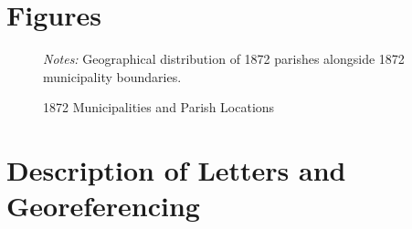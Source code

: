 \documentclass{article}
\begin{document}






\clearpage

\appendix

\setcounter{figure}{0}  
\setcounter{table}{0}  

\renewcommand{\thefigure}{A.\arabic{figure}}
\renewcommand{\thetable}{A.\arabic{table}}

\section{Figures}

\begin{figure}
  \caption{1872 Municipalities and Parish Locations}
  \begin{center}
  \textit{Notes:} Geographical distribution of 1872 parishes alongside 1872 municipality boundaries.
  \end{center}
  \label{fig:parishes_1872}
\end{figure}

\section{Description of Letters and Georeferencing}
\label{app:appendix_data}
\end{document}
